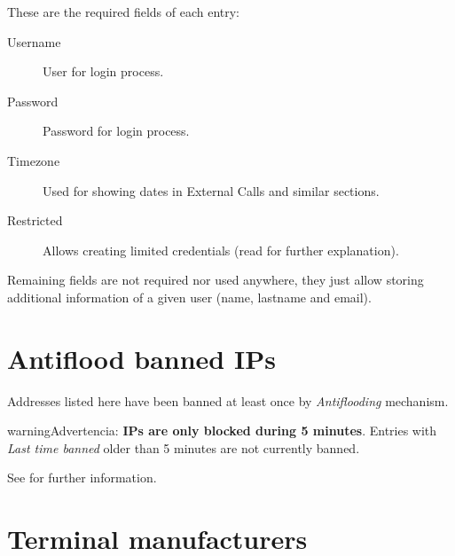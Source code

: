 \documentclass[letterpaper,10pt,spanish]{sphinxmanual}
\begin{document}
These are the required fields of each entry:
\begin{description}
\item[{Username}] \leavevmode{}\label{administration_portal/platform/main_operators:term-username}
User for login process.

\item[{Password}] \leavevmode{}\label{administration_portal/platform/main_operators:term-password}
Password for login process.

\item[{Timezone}] \leavevmode{}\label{administration_portal/platform/main_operators:term-timezone}
Used for showing dates in External Calls and similar sections.

\item[{Restricted}] \leavevmode{}\label{administration_portal/platform/main_operators:term-restricted}
Allows creating limited credentials (read {\hyperref[api_rest/acls:acls]{}} for further explanation).

\end{description}

Remaining fields are not required nor used anywhere, they just allow storing additional information of a given user
(name, lastname and email).


\section{Antiflood banned IPs}
\label{administration_portal/platform/antiflood_banned_ips:antiflood-banned-ips}\label{administration_portal/platform/antiflood_banned_ips::doc}
Addresses listed here have been banned at least once by \emph{Antiflooding} mechanism.

\begin{notice}{warning}{Advertencia:}
\textbf{IPs are only blocked during 5 minutes}. Entries with \emph{Last time banned} older than 5 minutes are not
currently banned.
\end{notice}

See {\hyperref[security_and_maintenance/security/antiflooding:sip\string-antiflooding]{}} for further information.


\section{Terminal manufacturers}
\label{administration_portal/platform/terminal_manufacturers:terminal-manufacturers}\label{administration_portal/platform/terminal_manufacturers::doc}\label{administration_portal/platform/terminal_manufacturers:provisioning}
\end{document}
